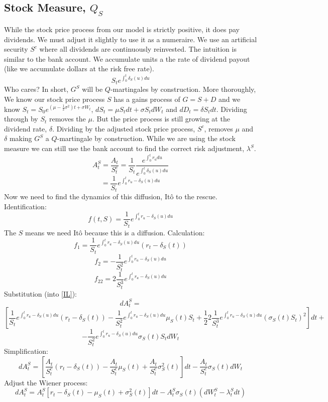 \documentclass[12pt]{article}
\begin{document}
\subsection{Stock Measure, $Q_S$}

While the stock price process from our model is strictly positive, it does pay
dividends. We must adjust it slightly to use it as a numeraire. We use an
artificial security $S^c$ where all dividends are continuously reinvested. The
intuition is similar to the bank account. We accumulate units a the rate of
dividend payout (like we accumulate dollars at the risk free rate).
\begin{equation} \label{stockNumeraire}
  S_te^{\int_0^t\delta_S(u)du}
\end{equation}
Who cares? In short, $G^S$ will be $Q$-martingales by construction. More
thoroughly, We know our stock price process $S$ has a gains process of
$G=S+D$ and we know $S_t=S_0e^{\left(\mu-\frac{1}{2}\sigma^2\right) t+
\sigma W_t}$, $dS_t=\mu S_tdt+\sigma S_tdW_t$ and $dD_t=\delta S_tdt$.
Dividing through by $S_t$ removes the $\mu$. But the price process is still
growing at the dividend rate, $\delta$. Dividing by the adjusted stock price
process, $S^c$, removes $\mu$ and $\delta$ making $G^S$ a $Q$-martingale by
construction. 
While we are using the stock measure we can still use the bank account to find
the correct risk adjustment, $\lambda^S$.
$$A_t^S=\frac{A_t}{S_t^c}=\frac{1}{S_t}
\frac{e^{\int_0^tr_udu}}{e^{\int_0^t\delta_S(u)du}}$$
$$=\frac{1}{S_t}e^{\int_0^tr_u-\delta_S(u)du}$$
Now we need to find the dynamics of this diffusion, It\^o to the rescue.
Identification:
$$f(t,S)=\frac{1}{S_t}e^{\int_0^tr_u-\delta_S(u)du}$$
The $S$ means we need It\^o because this is a diffusion. Calculation:
$$f_1=\frac{1}{S_t}e^{\int_0^tr_u-\delta_S(u)du}(r_t-\delta_S(t))$$
$$f_2=-\frac{1}{S_t^2}e^{\int_0^tr_u-\delta_S(u)du}$$
$$f_{22}=2\frac{1}{S_t^3}e^{\int_0^tr_u-\delta_S(u)du}$$
Substitution (into \ref{IL}):
$$dA_t^S=$$
$$\left[ \frac{1}{S_t}e^{\int_0^tr_u-\delta_S(u)du}(r_t-\delta_S(t))-
\frac{1}{S_t^2}e^{\int_0^tr_u-\delta_S(u)du}\mu_S(t)S_t+
\frac{1}{2}2\frac{1}{S_t^3}e^{\int_0^tr_u-\delta_S(u)du}(\sigma_S(t)S_t)^2
\right] dt+$$
$$-\frac{1}{S_t^2}e^{\int_0^tr_u-\delta_S(u)du}\sigma_S(t)S_tdW_t$$
Simplification:
$$dA_t^S=\left[ \frac{A_t}{S_t^c}(r_t-\delta_S(t))-\frac{A_t}{S_t^c}\mu_S(t)+
\frac{A_t}{S_t^c}\sigma_S^2(t) \right] dt-\frac{A_t}{S_t^c}\sigma_S(t)dW_t$$
Adjust the Wiener process:
$$dA_t^S=A_t^S\left[ r_t-\delta_S(t)-\mu_S(t)+\sigma_S^2(t)\right] dt-
A_t^S\sigma_S(t)\left( dW_t^S-\lambda_t^Sdt\right)$$
\end{document}
